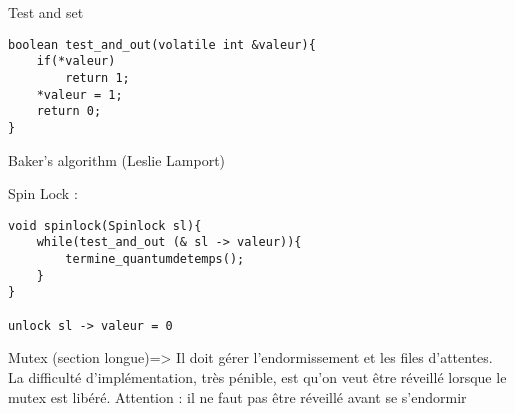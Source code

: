\documentclass{article}
\begin{document}
Test and set
\begin{verbatim}
boolean test_and_out(volatile int &valeur){
	if(*valeur)
		return 1;
	*valeur = 1;
	return 0;
}
\end{verbatim}

Baker's algorithm (Leslie Lamport)

Spin Lock :\\
\begin{verbatim}
void spinlock(Spinlock sl){
	while(test_and_out (& sl -> valeur)){
		termine_quantumdetemps();
	}
}

unlock sl -> valeur = 0
\end{verbatim}

Mutex (section longue)=> Il doit gérer l'endormissement et les files d'attentes.\\
La difficulté d'implémentation, très pénible, est qu'on veut être réveillé lorsque le mutex est libéré. Attention : il ne faut pas être réveillé avant se s'endormir
\end{document}
